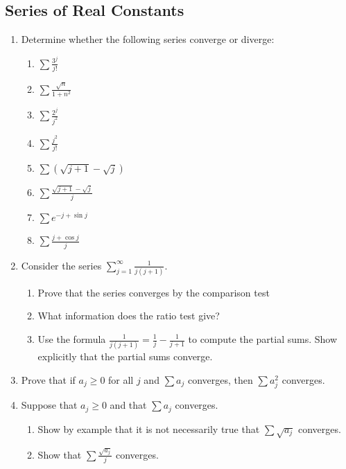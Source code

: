 \documentclass{article}
\begin{document}
\subsection{Series of Real Constants}
\begin{enumerate}
    \item Determine whether the following series converge
          or diverge:
          \begin{enumerate}
              \item $\sum\frac{3^j}{j!}$
              \item $\sum\frac{\sqrt{n}}{1+n^2}$
              \item $\sum\frac{2^j}{j^2}$
              \item $\sum\frac{j^2}{j!}$
              \item $\sum(\sqrt{j+1}-\sqrt{j})$
              \item $\sum\frac{\sqrt{j+1}-\sqrt{j}}{j}$
              \item $\sum e^{-j+\sin j}$
              \item $\sum\frac{j+\cos j}{j}$
          \end{enumerate}
          \setcounter{enumi}{3}
    \item Consider the series $\sum_{j=1}^\infty\frac{1}{j(j+1)}$.
          \begin{enumerate}
              \item Prove that the series converges by the
                    comparison test
              \item What information does the ratio test give?
              \item Use the formula $\frac{1}{j(j+1)}=\frac{1}{j}-\frac{1}{j+1}$
                    to compute the partial sums. Show explicitly that
                    the partial sums converge.
          \end{enumerate}
          \setcounter{enumi}{12}
    \item Prove that if $a_j\geq 0$ for all $j$ and $\sum a_j$
          converges, then $\sum a_j^2$ converges.
    \item Suppose that $a_j\geq 0$ and that $\sum a_j$ converges.
          \begin{enumerate}
              \item Show by example that it is not necessarily true that
                    $\sum\sqrt{a_j}$ converges.
              \item Show that $\sum\frac{\sqrt{a_j}}{j}$ converges.
          \end{enumerate}
\end{enumerate}
\end{document}
